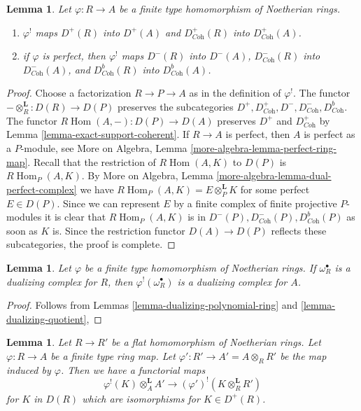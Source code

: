 \documentclass{stacks-project}
\theoremstyle{plain}
\newtheorem{lemma}[subsection]{Lemma}
\theoremstyle{definition}
\theoremstyle{remark}
\numberwithin{equation}{subsection}
\def\Hom{\mathop{\mathrm{Hom}}\nolimits}
\begin{document}
\begin{lemma}
\label{lemma-shriek-boundedness}
Let $\varphi : R \to A$ be a finite type homomorphism of Noetherian rings.
\begin{enumerate}
\item $\varphi^!$ maps $D^+(R)$ into $D^+(A)$ and
$D^+_{\textit{Coh}}(R)$ into $D^+_{\textit{Coh}}(A)$.
\item if $\varphi$ is perfect, then $\varphi^!$ maps
$D^-(R)$ into $D^-(A)$,
$D^-_{\textit{Coh}}(R)$ into $D^-_{\textit{Coh}}(A)$, and
$D^b_{\textit{Coh}}(R)$ into $D^b_{\textit{Coh}}(A)$.
\end{enumerate}
\end{lemma}

\begin{proof}
Choose a factorization $R \to P \to A$ as in the definition of $\varphi^!$.
The functor $- \otimes_R^\mathbf{L} : D(R) \to D(P)$ preserves
the subcategories
$D^+, D^+_{\textit{Coh}}, D^-, D^-_{\textit{Coh}}, D^b_{\textit{Coh}}$.
The functor $R\Hom(A, -) : D(P) \to D(A)$
preserves $D^+$ and $D^+_{\textit{Coh}}$ by
Lemma \ref{lemma-exact-support-coherent}.
If $R \to A$ is perfect, then $A$ is perfect as a $P$-module, see
More on Algebra, Lemma \ref{more-algebra-lemma-perfect-ring-map}.
Recall that the restriction of $R\Hom(A, K)$ to $D(P)$ is
$R\Hom_P(A, K)$. By More on Algebra, Lemma
\ref{more-algebra-lemma-dual-perfect-complex}
we have $R\Hom_P(A, K) = E \otimes_P^\mathbf{L} K$ for
some perfect $E \in D(P)$. Since we can represent $E$ by
a finite complex of finite projective $P$-modules
it is clear that $R\Hom_P(A, K)$ is in
$D^-(P), D^-_{\textit{Coh}}(P), D^b_{\textit{Coh}}(P)$
as soon as $K$ is. Since the restriction functor
$D(A) \to D(P)$ reflects these subcategories, the
proof is complete.
\end{proof}

\begin{lemma}
\label{lemma-shriek-dualizing-algebraic}
Let $\varphi$ be a finite type homomorphism of Noetherian rings.
If $\omega_R^\bullet$ is a dualizing complex for $R$, then
$\varphi^!(\omega_R^\bullet)$ is a dualizing complex for $A$.
\end{lemma}

\begin{proof}
Follows from Lemmas
\ref{lemma-dualizing-polynomial-ring} and
\ref{lemma-dualizing-quotient},
\end{proof}

\begin{lemma}
\label{lemma-flat-bc}
Let $R \to R'$ be a flat homomorphism of Noetherian rings.
Let $\varphi : R \to A$ be a finite type ring map.
Let $\varphi' : R' \to A' = A \otimes_R R'$ be the map induced by $\varphi$.
Then we have a functorial maps
$$
\varphi^!(K) \otimes_A^\mathbf{L} A' \longrightarrow
(\varphi')^!(K \otimes_R^\mathbf{L} R')
$$
for $K$ in $D(R)$ which are isomorphisms for $K \in D^+(R)$.
\end{lemma}
\end{document}
